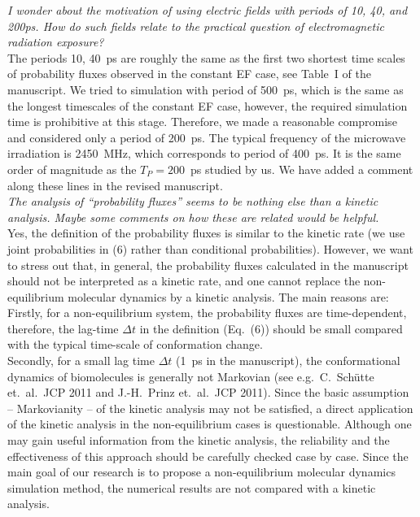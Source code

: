 \documentclass[]{revtex4-1}
\begin{document}
\emph{ I wonder about the motivation of using electric fields with
  periods of 10, 40, and 200ps. How do such fields relate to the
  practical question of electromagnetic radiation exposure?  }\\

The periods 10, 40~ps are roughly the same as the first two shortest
time scales of probability fluxes observed in the constant EF case,
see Table~I of the manuscript. We tried to simulation with period of
500~ps, which is the same as the longest timescales of the constant EF
case, however, the required simulation time is prohibitive at this stage. Therefore, we made a reasonable compromise and considered only
a period of 200~ps. The typical frequency of the microwave
irradiation is 2450~MHz, which corresponds to period of 400~ps. It is
the same order of magnitude as the $T_P=200$~ps studied by us.
We have added a comment along these lines in the revised manuscript.
\\

\emph{ The analysis of ``probability fluxes'' seems to be nothing else
  than a kinetic analysis. Maybe some comments on how these are
  related would be helpful.  }\\

Yes, the definition of the probability fluxes is similar to the
kinetic rate (we use joint probabilities in (6) rather than
conditional probabilities). However, we want to stress out that, in general,
the probability fluxes calculated in the manuscript should not be
interpreted as a kinetic rate, and one cannot replace the
non-equilibrium molecular dynamics by a kinetic analysis. The main
reasons are:
Firstly, for a non-equilibrium system, the probability fluxes are
time-dependent, therefore, the lag-time $\Delta t$ in the definition (Eq.~(6))
should be small compared with the typical time-scale of conformation change.\\
Secondly, for a small lag time $\Delta t$ (1~ps in the manuscript), the conformational
dynamics of biomolecules is generally not
Markovian (see e.g.~C.~Sch\"utte et.~al.~JCP 2011 and J.-H.~Prinz et.~al.~JCP 2011).
Since the basic assumption -- Markovianity -- of the kinetic analysis
may not be satisfied, a direct
application of the kinetic analysis in the non-equilibrium cases is questionable. Although one may
gain useful information from the kinetic analysis, the reliability
and the effectiveness of this approach should be carefully checked case
by case.  Since the main goal of our research is to propose a
non-equilibrium molecular dynamics simulation method, the numerical
results are not compared with a kinetic analysis.\\
\end{document}
